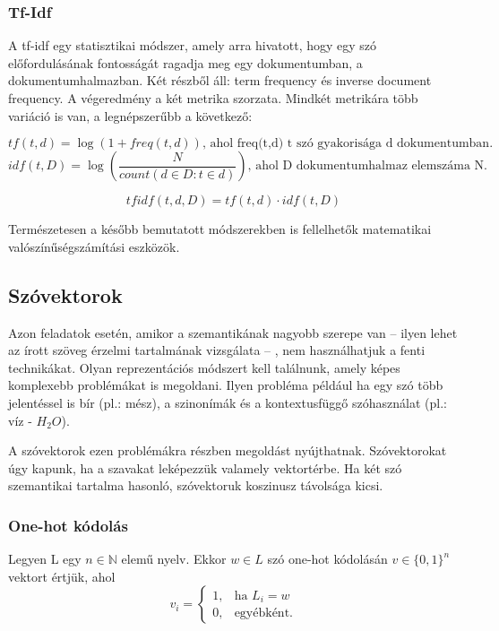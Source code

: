 \subsubsection{Tf-Idf}

A tf-idf egy statisztikai módszer, amely arra hivatott, hogy egy szó előfordulásának fontosságát ragadja meg egy dokumentumban, a dokumentumhalmazban. Két részből áll: term frequency és inverse document frequency. A végeredmény a két metrika szorzata. Mindkét metrikára több variáció is van, a legnépszerűbb a következő:

\begin{definition}
$$tf\left(t,d\right) = \log \left( 1 + freq\left(t,d\right)\right) \text{, ahol freq(t,d) t szó gyakorisága d dokumentumban.}$$
$$idf\left(t,D\right) = \log \left( \frac{N}{count \left( d \in D:t \in d \right) } \right) \text{, ahol D dokumentumhalmaz elemszáma N.}$$

$$tfidf(t,d,D) = tf(t,d) \cdot idf(t,D)$$

\end{definition}

\begin{note}
	Természetesen a később bemutatott módszerekben is fellelhetők matematikai valószínűségszámítási eszközök.
\end{note}

\subsection{Szóvektorok}

Azon feladatok esetén, amikor a szemantikának nagyobb szerepe van – ilyen lehet az írott szöveg érzelmi tartalmának vizsgálata – , nem használhatjuk a fenti technikákat. Olyan reprezentációs módszert kell találnunk, amely képes komplexebb problémákat is megoldani. Ilyen probléma például ha egy szó több jelentéssel is bír (pl.: mész), a szinonímák és a kontextusfüggő szóhasználat (pl.: víz - $H_2O$).

A szóvektorok ezen problémákra részben megoldást nyújthatnak. Szóvektorokat úgy kapunk, ha a szavakat leképezzük valamely vektortérbe. Ha két szó szemantikai tartalma hasonló, szóvektoruk koszinusz távolsága kicsi.

\subsubsection{One-hot kódolás}

\begin{definition}
Legyen L egy $n \in \mathbb{N}$ elemű nyelv. Ekkor $w \in L$ szó one-hot kódolásán $v \in \{0,1\}^n$ vektort értjük, ahol 
\[
v_i= 
\begin{cases}
1,				& \text{ha } L_i = w\\
0,              & \text{egyébként.}
\end{cases}
\]
\end{definition}

